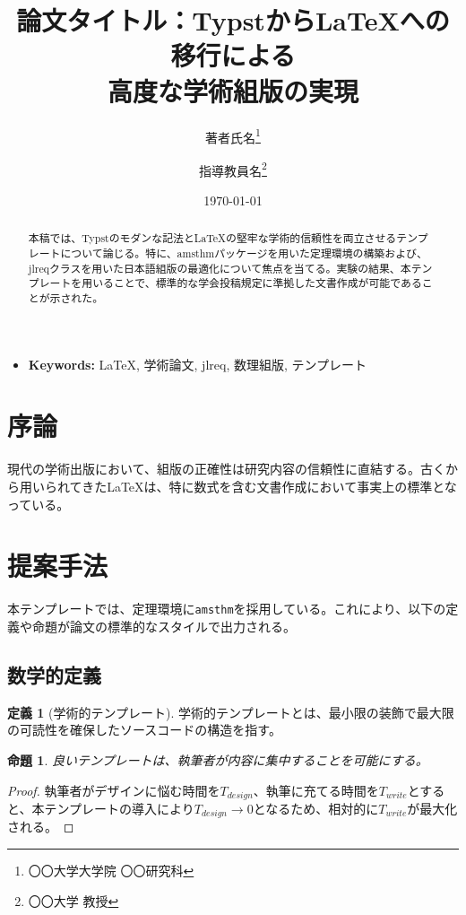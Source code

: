\documentclass[
  paper=a4,
  fontsize=10.5pt,
  twocolumn, %
  column_gap=2zw,
  number_of_lines=40,
  line_length=45zw
]{jlreq}
\title{論文タイトル：TypstからLaTeXへの移行による\\高度な学術組版の実現}
\author{著者氏名\thanks{〇〇大学大学院 〇〇研究科} \and 指導教員名\thanks{〇〇大学 教授}}
\date{\today}
\theoremstyle{definition}
\newtheorem{definition}{定義}[section]
\theoremstyle{plain}
\newtheorem{proposition}[theorem]{命題}
\theoremstyle{remark}
\begin{document}
\maketitle

\begin{abstract}
本稿では、Typstのモダンな記法とLaTeXの堅牢な学術的信頼性を両立させるテンプレートについて論じる。特に、amsthmパッケージを用いた定理環境の構築および、jlreqクラスを用いた日本語組版の最適化について焦点を当てる。実験の結果、本テンプレートを用いることで、標準的な学会投稿規定に準拠した文書作成が可能であることが示された。
\end{abstract}

\begin{itemize}[label={}]
    \item \textbf{Keywords:} LaTeX, 学術論文, jlreq, 数理組版, テンプレート
\end{itemize}

\section{序論}
現代の学術出版において、組版の正確性は研究内容の信頼性に直結する。古くから用いられてきた\LaTeX{}は、特に数式を含む文書作成において事実上の標準となっている。

\section{提案手法}
本テンプレートでは、定理環境に\texttt{amsthm}を採用している。これにより、以下の定義や命題が論文の標準的なスタイルで出力される。

\subsection{数学的定義}
\begin{definition}[学術的テンプレート]
学術的テンプレートとは、最小限の装飾で最大限の可読性を確保したソースコードの構造を指す。
\end{definition}

\begin{proposition}
良いテンプレートは、執筆者が内容に集中することを可能にする。
\end{proposition}

\begin{proof}
執筆者がデザインに悩む時間を$T_{design}$、執筆に充てる時間を$T_{write}$とすると、本テンプレートの導入により$T_{design} \to 0$となるため、相対的に$T_{write}$が最大化される。
\end{proof}
\end{document}
